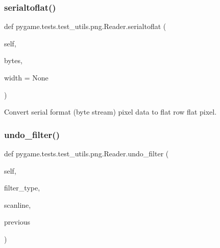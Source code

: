 \subsubsection{\texorpdfstring{serialtoflat()}{serialtoflat()}}
{\footnotesize\ttfamily def pygame.\+tests.\+test\+\_\+utils.\+png.\+Reader.\+serialtoflat (\begin{DoxyParamCaption}\item[{}]{self,  }\item[{}]{bytes,  }\item[{}]{width = {\ttfamily None} }\end{DoxyParamCaption})}

\begin{DoxyVerb}Convert serial format (byte stream) pixel data to flat row
flat pixel.
\end{DoxyVerb}
 \mbox{\label{classpygame_1_1tests_1_1test__utils_1_1png_1_1_reader_ae3ed79bc9eea16f435d70da9acb41390}} 
\subsubsection{\texorpdfstring{undo\+\_\+filter()}{undo\_filter()}}
{\footnotesize\ttfamily def pygame.\+tests.\+test\+\_\+utils.\+png.\+Reader.\+undo\+\_\+filter (\begin{DoxyParamCaption}\item[{}]{self,  }\item[{}]{filter\+\_\+type,  }\item[{}]{scanline,  }\item[{}]{previous }\end{DoxyParamCaption})}

